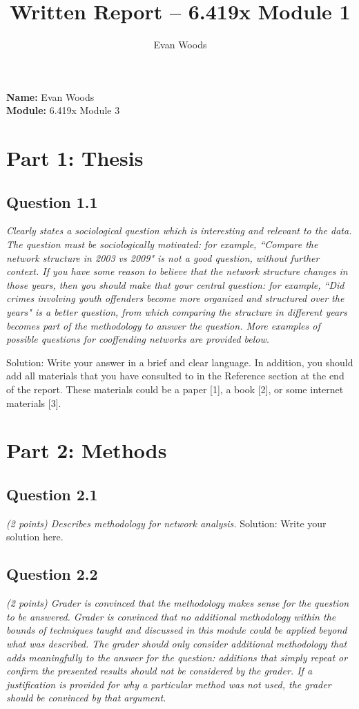\documentclass[12pt]{article}
\title{Written Report – 6.419x Module 1}
\author{Evan Woods}
\date{}
\begin{document}
\maketitle

\tableofcontents
\newpage


\noindent \textbf{Name:} Evan Woods \\
\noindent \textbf{Module:} 6.419x Module 3

\section{Part 1: Thesis}

\subsection{Question 1.1}
\textit{Clearly states a sociological question which is interesting and relevant to the data. The question must be sociologically motivated: for example, “Compare the network structure in 2003 vs 2009" is not a good question, without further context. If you have some reason to believe that the network structure changes in those years, then you should make that your central question: for example, “Did crimes involving youth offenders become more organized and structured over the years" is a better question, from which comparing the structure in different years becomes part of the methodology to answer the question. More examples of possible questions for cooffending networks are provided below. }

Solution: Write your answer in a brief and clear language. In addition, you should add all materials that you have consulted to in the Reference section at the end of the report. These materials could be a paper [1], a book [2], or some internet materials [3].


\section{Part 2: Methods}

\subsection{Question 2.1}
\textit{ (2 points) Describes methodology for network analysis.}
Solution: Write your solution here.

\subsection{Question 2.2}
\textit{(2 points) Grader is convinced that the methodology makes sense for the question to be answered. Grader is convinced that no additional methodology within the bounds of techniques taught and discussed in this module could be applied beyond what was described. The grader should only consider additional methodology that adds meaningfully to the answer for the question: additions that simply repeat or confirm the presented results should not be considered by the grader. If a justification is provided for why a particular method was not used, the grader should be convinced by that argument. }
\end{document}

